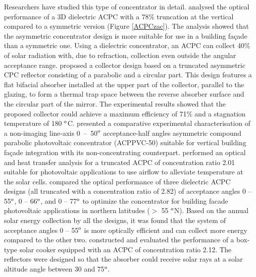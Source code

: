 Researchers have studied this type of concentrator in detail. \citet{Zacharopoulos2000} analysed the optical performance of a 3D dielectric ACPC with a 78\% truncation at the vertical compared to a symmetric version (Figure \ref{ACPCzac}). The analysis showed that the asymmetric concentrator design is more suitable for use in a building fa\c{c}ade than a symmetric one. Using a dielectric concentrator, an ACPC can collect 40\% of solar radiation with, due to refraction, collection even outside the angular acceptance range. \citet{Tripanagnostopoulos2000} proposed a collector design based on a truncated asymmetric CPC reflector consisting of a parabolic and a circular part. This design features a flat bifacial absorber installed at the upper part of the collector, parallel to the glazing, to form a thermal trap space between the reverse absorber surface and the circular part of the mirror. The experimental results showed that the proposed collector could achieve a maximum efficiency of 71\% and a stagnation temperature of 180 $^{\rm{o}}$C. \citet{Mallick2006} presented a comparative experimental characterisation of a non-imaging line-axis 0~--~50$^{\rm{o}}$ acceptance-half angles asymmetric compound parabolic photovoltaic concentrator (ACPPVC-50) suitable for vertical building fa\c{c}ade integration with its non-concentrating counterpart. \citet{Mallick2007b} performed an optical and heat transfer analysis for a truncated ACPC of concentration ratio 2.01 suitable for photovoltaic applications to use airflow to alleviate temperature at the solar cells. \citet{Sarmah2011} compared the optical performance of three dielectric ACPC designs (all truncated with a concentration ratio of 2.82) of acceptance angles 0 -- 55$^{\rm{o}}$, 0 -- 66$^{\rm{o}}$, and 0 -- 77$^{\rm{o}}$ to optimize the concentrator for building facade photovoltaic applications in northern latitudes ($>$ 55 $^{\rm{o}}$N). Based on the annual solar energy collection by all the designs, it was found that the system of acceptance angles 0 -- 55$^{\rm{o}}$ is more optically efficient and can collect more energy compared to the other two. \citet{Harmim2012} constructed and evaluated the performance of a box-type solar cooker equipped with an ACPC of concentration ratio 2.12. The reflectors were designed so that the absorber could receive solar rays at a solar altitude angle between 30 and 75$^{\rm{o}}$.


